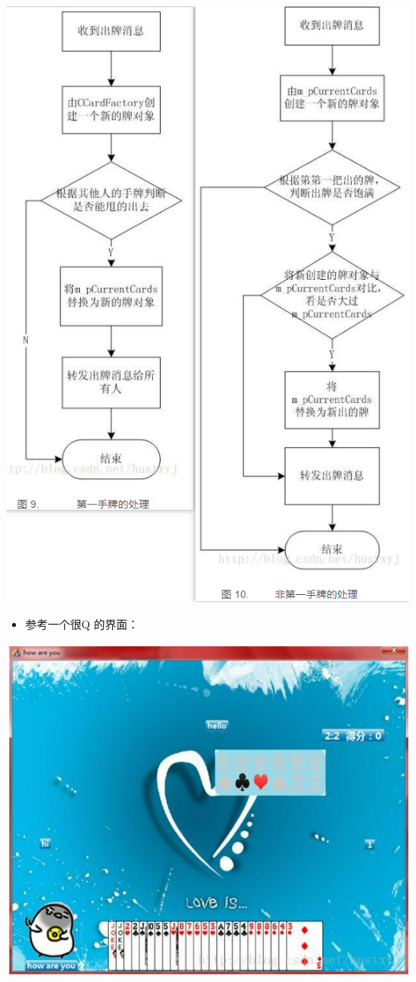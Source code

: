\documentclass[9pt, b5paper]{article}
\begin{document}
\includegraphics[width=.9\linewidth]{./pic/plan_20230508_223827.png}

\begin{itemize}
\item 参考一个很Q 的界面：
\end{itemize}

\includegraphics[width=.9\linewidth]{./pic/plan_20230508_222717.png}
\end{document}
